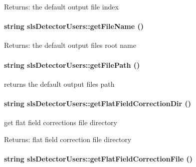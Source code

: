 \begin{Desc}
\item[Returns:]the default output file index \end{Desc}
\hypertarget{classslsDetectorUsers_5f30c83e8bf07a92fad0916d43e3799c}{
\paragraph[getFileName]{\setlength{\rightskip}{0pt plus 5cm}string sls\-Detector\-Users::get\-File\-Name ()}\hfill}
\label{classslsDetectorUsers_5f30c83e8bf07a92fad0916d43e3799c}


\begin{Desc}
\item[Returns:]the default output files root name \end{Desc}
\hypertarget{classslsDetectorUsers_81969295c2b08f14e9c3d4fa1f7d4e16}{
\paragraph[getFilePath]{\setlength{\rightskip}{0pt plus 5cm}string sls\-Detector\-Users::get\-File\-Path ()}\hfill}
\label{classslsDetectorUsers_81969295c2b08f14e9c3d4fa1f7d4e16}


returns the default output files path 

\hypertarget{classslsDetectorUsers_0b20511a94205abd689f31bd1a2d4c18}{
\paragraph[getFlatFieldCorrectionDir]{\setlength{\rightskip}{0pt plus 5cm}string sls\-Detector\-Users::get\-Flat\-Field\-Correction\-Dir ()}\hfill}
\label{classslsDetectorUsers_0b20511a94205abd689f31bd1a2d4c18}


get flat field corrections file directory 

\begin{Desc}
\item[Returns:]flat field correction file directory \end{Desc}
\hypertarget{classslsDetectorUsers_a83083f73523557e6129f33b59f38327}{
\paragraph[getFlatFieldCorrectionFile]{\setlength{\rightskip}{0pt plus 5cm}string sls\-Detector\-Users::get\-Flat\-Field\-Correction\-File ()}\hfill}
\label{classslsDetectorUsers_a83083f73523557e6129f33b59f38327}


